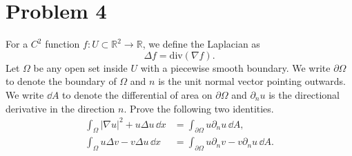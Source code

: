 \documentclass[11pt]{article}
\begin{document}
\section*{Problem 4}
\begin{problem}
    For a $C^2$ function $f:U\subset\mathbb{R}^2\rightarrow\mathbb{R}$, we define the
Laplacian as
\begin{equation*}
\Delta f=\mathrm{div}(\nabla f).
\end{equation*}
Let $\Omega$ be any open set inside $U$ with a piecewise smooth boundary. We write
$\partial\Omega$ to denote the boundary of $\Omega$ and $n$ is the unit normal
vector pointing outwards. We write $\dd A$ to denote the differential of area on $\partial \Omega$ and $\partial_n u$ is the directional derivative in the direction
$n$. Prove the following two identities.
\begin{align*}
\int_\Omega |\nabla u|^2 + u \Delta u \, \dd x &= \int_{\partial \Omega} u \partial_n u \, \dd A, \\
\int_\Omega u \Delta v - v \Delta u \, \dd x &= \int_{\partial \Omega} u \partial_n
v - v \partial_n u \, \dd A.
\end{align*}
\end{problem}
\end{document}
